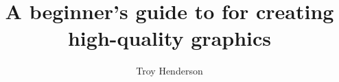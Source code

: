 \documentclass[final]{ltugproc}
\begin{document}
\setlength{\emergencystretch}{1em}

\title{A beginner's guide to \MP{} for creating high-quality graphics}
\author{Troy Henderson}
\address{Department of Mathematical Sciences\\United States Military Academy\\West Point, NY  10996, USA\\\href{mailto:troy (at) tlhiv dot org}{\texttt{troy (at) tlhiv dot org}}\\\href{http://www.tlhiv.org}{\texttt{http://www.tlhiv.org}}}
\netaddress{}
\personalURL{}


\maketitle









\setlength{\emergencystretch}{0sp}
\end{document}
